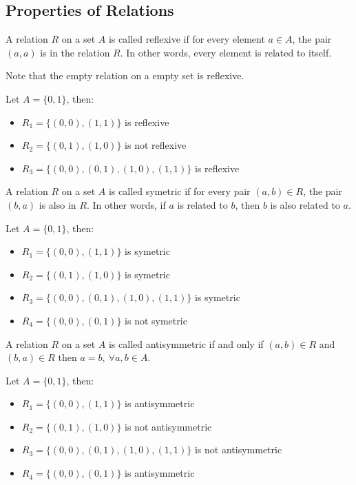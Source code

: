 \subsection{Properties of Relations}
\begin{definition}
    A relation $R$ on a set $A$ is called reflexive if for every element $a \in A$, the pair $(a, a)$ is in the relation $R$. In other words, every element is related to itself.
\end{definition}
Note that the empty relation on a empty set is reflexive.
\begin{eg}
    Let $A = \{0,1\}$, then:
    \begin{itemize}[itemsep=1pt,label=$\circ$]
        \item $R_1 = \{(0,0), (1,1)\}$ is reflexive
        \item $R_2 = \{(0,1), (1,0)\}$ is not reflexive
        \item $R_3 = \{(0,0), (0,1), (1,0), (1,1)\}$ is reflexive
    \end{itemize}
\end{eg}

\begin{definition}
    A relation $R$ on a set $A$ is called symetric if for every pair $(a, b) \in R$, the pair $(b, a)$ is also in $R$. In other words, if $a$ is related to $b$, then $b$ is also related to $a$.
\end{definition}
\begin{eg}
    Let $A = \{0,1\}$, then:
    \begin{itemize}[itemsep=1pt,label=$\circ$]
        \item $R_1 = \{(0,0), (1,1)\}$ is symetric
        \item $R_2 = \{(0,1), (1,0)\}$ is symetric
        \item $R_3 = \{(0,0), (0,1), (1,0), (1,1)\}$ is symetric
        \item $R_4 = \{(0,0), (0,1)\}$ is not symetric
    \end{itemize}
\end{eg}

\begin{definition}
    A relation $R$ on a set $A$ is called antisymmetric if and only if $(a,b) \in R$ and $(b,a) \in R$ then $a = b, \ \forall a,b \in A$.
\end{definition}
\begin{eg}
    Let $A = \{0,1\}$, then:
    \begin{itemize}[itemsep=1pt,label=$\circ$]
        \item $R_1 = \{(0,0), (1,1)\}$ is antisymmetric
        \item $R_2 = \{(0,1), (1,0)\}$ is not antisymmetric
        \item $R_3 = \{(0,0), (0,1), (1,0), (1,1)\}$ is not antisymmetric
        \item $R_4 = \{(0,0), (0,1)\}$ is antisymmetric
    \end{itemize}
\end{eg}

